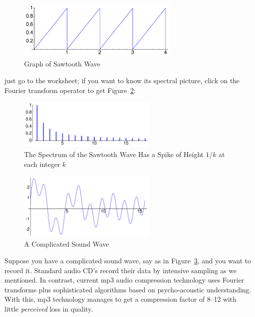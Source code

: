 \documentclass[11pt]{article}
\theoremstyle{plain}
\theoremstyle{definition}
\numberwithin{equation}{section}
\numberwithin{figure}{section}
\numberwithin{table}{section}
\begin{document}
   
\begin{figure}[htbp]
\begin{center}
\includegraphics[width=0.7\textwidth]{illustrations/sawtooth}
\end{center}
\caption{Graph of Sawtooth Wave\label{fig:sawtooth}}
\end{figure}

\noindent just go to the worksheet; if you want to know its spectral picture, click on the Fourier transform operator to get Figure~\ref{fig:sawtooth-spectrum}:
    
 \bigskip


\begin{figure}[htbp]
\begin{center}
\includegraphics[width=0.6\textwidth]{illustrations/sawtooth-spectrum}
\end{center}
\caption{The Spectrum of the Sawtooth Wave Has a Spike of Height $1/k$ at 
each integer $k$\label{fig:sawtooth-spectrum}}
\end{figure}
  

       
\begin{figure}[htbp]
\begin{center}
\includegraphics[width=0.6\textwidth]{illustrations/complicated-wave}
\end{center}
\caption{A Complicated Sound Wave\label{fig:complicated-wave}}
\end{figure}
Suppose you have a complicated sound wave, say as in
Figure~\ref{fig:complicated-wave}, and you want to record it.
Standard audio CD's record their data by intensive sampling as we
mentioned. In contrast, current mp3 audio compression technology uses
Fourier transforms plus sophisticated algorithms based on
psycho-acoustic understanding. With this, mp3 technology manages to
get a compression factor of 8--12 with little {\em perceived} loss in
quality.
 
\end{document}
